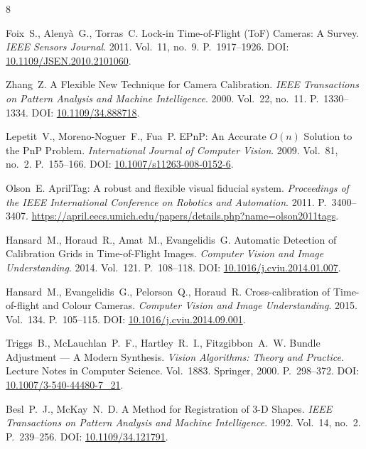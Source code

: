 \begin{thebibliography}{8}

Foix~S., Alenyà~G., Torras~C. Lock-in Time-of-Flight (ToF) Cameras: A Survey.
\textit{IEEE Sensors Journal}. 2011. Vol.~11, no.~9. P.~1917--1926.
DOI: \href{https://doi.org/10.1109/JSEN.2010.2101060}{10.1109/JSEN.2010.2101060}.

Zhang~Z. A Flexible New Technique for Camera Calibration.
\textit{IEEE Transactions on Pattern Analysis and Machine Intelligence}.
2000. Vol.~22, no.~11. P.~1330--1334.
DOI: \href{https://doi.org/10.1109/34.888718}{10.1109/34.888718}.

Lepetit~V., Moreno-Noguer~F., Fua~P. EPnP: An Accurate $O(n)$ Solution to the PnP Problem.
\textit{International Journal of Computer Vision}.
2009. Vol.~81, no.~2. P.~155--166.
DOI: \href{https://doi.org/10.1007/s11263-008-0152-6}{10.1007/s11263-008-0152-6}.

Olson~E. AprilTag: A robust and flexible visual fiducial system.
\textit{Proceedings of the IEEE International Conference on Robotics and Automation}.
2011. P.~3400--3407.
\url{https://april.eecs.umich.edu/papers/details.php?name=olson2011tags}.

Hansard~M., Horaud~R., Amat~M., Evangelidis~G.
Automatic Detection of Calibration Grids in Time-of-Flight Images.
\textit{Computer Vision and Image Understanding}.
2014. Vol.~121. P.~108--118.
DOI: \href{https://doi.org/10.1016/j.cviu.2014.01.007}{10.1016/j.cviu.2014.01.007}.

Hansard~M., Evangelidis~G., Pelorson~Q., Horaud~R.
Cross-calibration of Time-of-flight and Colour Cameras.
\textit{Computer Vision and Image Understanding}.
2015. Vol.~134. P.~105--115.
DOI: \href{https://doi.org/10.1016/j.cviu.2014.09.001}{10.1016/j.cviu.2014.09.001}.

Triggs~B., McLauchlan~P.~F., Hartley~R.~I., Fitzgibbon~A.~W.
Bundle Adjustment --- A Modern Synthesis.
\textit{Vision Algorithms: Theory and Practice}.
Lecture Notes in Computer Science. Vol.~1883.
Springer, 2000. P.~298--372.
DOI: \href{https://doi.org/10.1007/3-540-44480-7_21}{10.1007/3-540-44480-7\_21}.

Besl~P.~J., McKay~N.~D. A Method for Registration of 3-D Shapes.
\textit{IEEE Transactions on Pattern Analysis and Machine Intelligence}.
1992. Vol.~14, no.~2. P.~239--256.
DOI: \href{https://doi.org/10.1109/34.121791}{10.1109/34.121791}.

\end{thebibliography}
